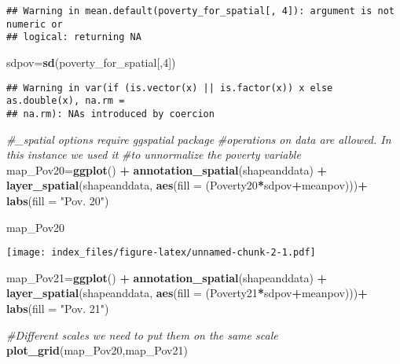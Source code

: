 \documentclass[
]{article}
\newenvironment{Shaded}{\begin{snugshade}}{\end{snugshade}}
\newcommand{\AttributeTok}[1]{\textcolor[rgb]{0.13,0.29,0.53}{#1}}
\newcommand{\CommentTok}[1]{\textcolor[rgb]{0.56,0.35,0.01}{\textit{#1}}}
\newcommand{\DecValTok}[1]{\textcolor[rgb]{0.00,0.00,0.81}{#1}}
\newcommand{\FunctionTok}[1]{\textcolor[rgb]{0.13,0.29,0.53}{\textbf{#1}}}
\newcommand{\NormalTok}[1]{#1}
\newcommand{\OtherTok}[1]{\textcolor[rgb]{0.56,0.35,0.01}{#1}}
\newcommand{\SpecialCharTok}[1]{\textcolor[rgb]{0.81,0.36,0.00}{\textbf{#1}}}
\newcommand{\StringTok}[1]{\textcolor[rgb]{0.31,0.60,0.02}{#1}}
\begin{document}
\begin{verbatim}
## Warning in mean.default(poverty_for_spatial[, 4]): argument is not numeric or
## logical: returning NA
\end{verbatim}

\begin{Shaded}
\begin{Highlighting}[]
\NormalTok{sdpov}\OtherTok{=}\FunctionTok{sd}\NormalTok{(poverty\_for\_spatial[,}\DecValTok{4}\NormalTok{])}
\end{Highlighting}
\end{Shaded}

\begin{verbatim}
## Warning in var(if (is.vector(x) || is.factor(x)) x else as.double(x), na.rm =
## na.rm): NAs introduced by coercion
\end{verbatim}

\begin{Shaded}
\begin{Highlighting}[]
\CommentTok{\#\_spatial options require ggspatial package}
\CommentTok{\#operations on data are allowed. In this instance we used it}
\CommentTok{\#to unnormalize the poverty variable}
\NormalTok{map\_Pov20}\OtherTok{=}\FunctionTok{ggplot}\NormalTok{() }\SpecialCharTok{+}
  \FunctionTok{annotation\_spatial}\NormalTok{(shapeanddata) }\SpecialCharTok{+}
  \FunctionTok{layer\_spatial}\NormalTok{(shapeanddata, }\FunctionTok{aes}\NormalTok{(}\AttributeTok{fill =}\NormalTok{ (Poverty20}\SpecialCharTok{*}\NormalTok{sdpov}\SpecialCharTok{+}\NormalTok{meanpov)))}\SpecialCharTok{+}
  \FunctionTok{labs}\NormalTok{(}\AttributeTok{fill =} \StringTok{"Pov. 20"}\NormalTok{)}

\NormalTok{map\_Pov20}
\end{Highlighting}
\end{Shaded}

\texttt{[image: index\_files/figure-latex/unnamed-chunk-2-1.pdf]}

\begin{Shaded}
\begin{Highlighting}[]
\NormalTok{map\_Pov21}\OtherTok{=}\FunctionTok{ggplot}\NormalTok{() }\SpecialCharTok{+}
  \FunctionTok{annotation\_spatial}\NormalTok{(shapeanddata) }\SpecialCharTok{+}
  \FunctionTok{layer\_spatial}\NormalTok{(shapeanddata, }\FunctionTok{aes}\NormalTok{(}\AttributeTok{fill =}\NormalTok{ (Poverty21}\SpecialCharTok{*}\NormalTok{sdpov}\SpecialCharTok{+}\NormalTok{meanpov)))}\SpecialCharTok{+}
  \FunctionTok{labs}\NormalTok{(}\AttributeTok{fill =} \StringTok{"Pov. 21"}\NormalTok{)}

\CommentTok{\#Different scales we need to put them on the same scale}
\FunctionTok{plot\_grid}\NormalTok{(map\_Pov20,map\_Pov21)}
\end{Highlighting}
\end{Shaded}
\end{document}
